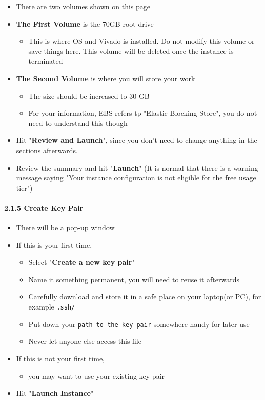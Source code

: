 \documentclass[]{article}
\let\oldparagraph\paragraph
\renewcommand{\paragraph}[1]{\oldparagraph{#1}\mbox{}}
\begin{document}
\begin{itemize}
\item
  There are two volumes shown on this page 
\item
  \textbf{The First Volume} is the 70GB root drive

  \begin{itemize}
  \item
    This is where OS and Vivado is installed. Do not modify this volume
    or save things here. This volume will be deleted once the instance
    is terminated
  \end{itemize}
\item
  \textbf{The Second Volume} is where you will store your work

  \begin{itemize}
  \item
    The size should be increased to 30 GB
  \item
    For your information, EBS refers tp "Elastic Blocking Store", you do
    not need to understand this though
  \end{itemize}
\item
  Hit "\textbf{Review and Launch}", since you don't need to change
  anything in the sections afterwards.
\item
  Review the summary and hit "\textbf{Launch}" (It is normal that there
  is a warning message saying "Your instance configuration is not
  eligible for the free usage tier")
\end{itemize}

\hypertarget{header-n156}{%
\paragraph{2.1.5 Create Key Pair}\label{header-n156}}

\begin{itemize}
\item
  There will be a pop-up window
\item
  If this is your first time,

  \begin{itemize}
  \item
    Select "\textbf{Create a new key pair}"
  \item
    Name it something permanent, you will need to reuse it afterwards
  \item
    Carefully download and store it in a safe place on your laptop(or
    PC), for example \texttt{.ssh/}
  \item
    Put down your \texttt{path\ to\ the\ key\ pair} somewhere handy for
    later use 
  \item
    Never let anyone else access this file
  \end{itemize}
\item
  If this is not your first time,

  \begin{itemize}
  \item
    you may want to use your existing key pair
  \end{itemize}
\item
  Hit "\textbf{Launch Instance}"
\end{itemize}
\end{document}
